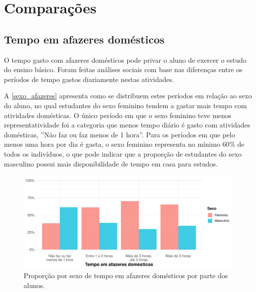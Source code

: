 

\chapter{Comparações}
\section{Tempo em afazeres domésticos}
O tempo gasto com afazeres domésticos pode privar o aluno de exercer o estudo
do ensino básico. Foram feitas análises sociais com base nas diferenças entre os 
períodos de tempo gastos diariamente nestas atividades.

A \autoref{sexo_afazeres} apresenta como se distribuem estes períodos em relação ao sexo
do aluno, no qual estudantes do sexo feminino tendem a gastar mais tempo com atividades
domésticas. O único período em que o sexo feminino teve menos representatividade foi a 
categoria que menos tempo diário é gasto com atividades domésticas, ''Não faz ou faz
menos de 1 hora''.
Para os períodos em que pelo menos uma hora por dia é gasta, o sexo feminino
representa no mínimo 60\% de todos os indivíduos, o que pode indicar que a proporção 
de estudantes do sexo masculino possui mais disponibilidade de tempo em casa para estudos.

\begin{figure}[h]
    \label{sexo_afazeres}
    \caption{Proporção por sexo de tempo em afazeres domésticos por parte
    dos alunos.\label{sexo_afazeres}} %
    \begin{center}
        \includegraphics[width=16cm]{img/sexo_afazeres.pdf}
    \end{center}
\end{figure}


